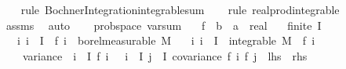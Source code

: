 \begin{isabellebody}
\ \ \isamarkupfalse%
\ {\isacharparenleft}{\kern0pt}rule\ Bochner{\isacharunderscore}{\kern0pt}Integration{\isachardot}{\kern0pt}integrable{\isacharunderscore}{\kern0pt}sum{\isacharparenright}{\kern0pt}\isanewline
\ \ \isamarkupfalse%
\ {\isacharparenleft}{\kern0pt}rule\ real{\isacharunderscore}{\kern0pt}prod{\isacharunderscore}{\kern0pt}integrable{\isacharparenright}{\kern0pt}\isanewline
\ \ \isamarkupfalse%
\ assms\ \isamarkupfalse%
\ auto%
\endisatagproof
{\isafoldproof}%
%
\isadelimproof
\ \isanewline
%
\endisadelimproof
\isanewline
{}\isamarkupfalse%
\ {\isacharparenleft}{\kern0pt}\ prob{\isacharunderscore}{\kern0pt}space{\isacharparenright}{\kern0pt}\ var{\isacharunderscore}{\kern0pt}sum{\isacharunderscore}{\kern0pt}{}{\isacharcolon}{\kern0pt}\isanewline
\ \ \ f\ {\isacharcolon}{\kern0pt}{\isacharcolon}{\kern0pt}\ {\isachardoublequoteopen}{\isacharprime}{\kern0pt}b\ {\isasymRightarrow}\ {\isacharprime}{\kern0pt}a\ {\isasymRightarrow}\ real{\isachardoublequoteclose}\isanewline
\ \ \ {\isachardoublequoteopen}finite\ I{\isachardoublequoteclose}\isanewline
\ \ \ {\isachardoublequoteopen}{\isasymAnd}i{\isachardot}{\kern0pt}\ i\ {\isasymin}\ I\ {\isasymLongrightarrow}\ f\ i\ {\isasymin}\ borel{\isacharunderscore}{\kern0pt}measurable\ M{\isachardoublequoteclose}\isanewline
\ \ \ {\isachardoublequoteopen}{\isasymAnd}i{\isachardot}{\kern0pt}\ i\ {\isasymin}\ I\ {\isasymLongrightarrow}\ integrable\ M\ {\isacharparenleft}{\kern0pt}{\isasymlambda}{\isasymomega}{\isachardot}{\kern0pt}\ f\ i\ {\isasymomega}{\isacharcircum}{\kern0pt}{}{\isacharparenright}{\kern0pt}{\isachardoublequoteclose}\isanewline
\ \ \ \isanewline
\ \ \ \ {\isachardoublequoteopen}variance\ {\isacharparenleft}{\kern0pt}{\isasymlambda}{\isasymomega}{\isachardot}{\kern0pt}\ {\isacharparenleft}{\kern0pt}{\isasymSum}i\ {\isasymin}\ I{\isachardot}{\kern0pt}\ f\ i\ {\isasymomega}{\isacharparenright}{\kern0pt}{\isacharparenright}{\kern0pt}\ {\isacharequal}{\kern0pt}\ {\isacharparenleft}{\kern0pt}{\isasymSum}i\ {\isasymin}\ I{\isachardot}{\kern0pt}\ {\isacharparenleft}{\kern0pt}{\isasymSum}j\ {\isasymin}\ I{\isachardot}{\kern0pt}\ covariance\ {\isacharparenleft}{\kern0pt}f\ i{\isacharparenright}{\kern0pt}\ {\isacharparenleft}{\kern0pt}f\ j{\isacharparenright}{\kern0pt}{\isacharparenright}{\kern0pt}{\isacharparenright}{\kern0pt}{\isachardoublequoteclose}\ {\isacharparenleft}{\kern0pt}\ {\isachardoublequoteopen}{\isacharquery}{\kern0pt}lhs\ {\isacharequal}{\kern0pt}\ {\isacharquery}{\kern0pt}rhs{\isachardoublequoteclose}{\isacharparenright}{\kern0pt}\isanewline

\end{isabellebody}
